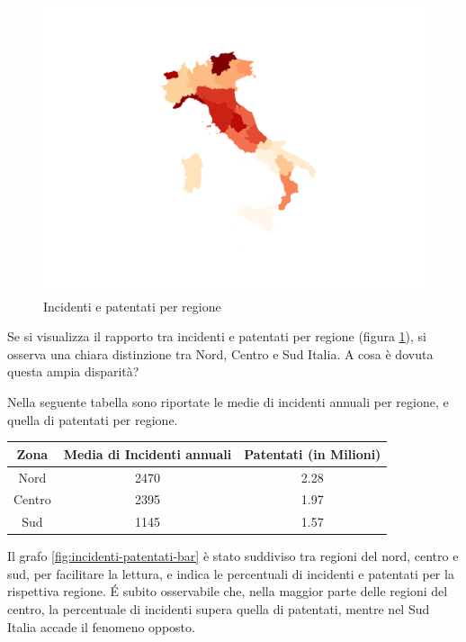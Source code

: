 \documentclass[a4paper,12pt]{report}
\begin{document}
\begin{figure}
    \includegraphics[width=\linewidth]{../src/incidenti/incidenti_aci/mappe_regioni/incidenti_patenti_italia.png}
    \caption{Incidenti e patentati per regione}
    \label{fig:incidenti-patentati}
\end{figure}

Se si visualizza il rapporto tra incidenti e patentati per regione 
(figura \ref{fig:incidenti-patentati}), si osserva una chiara distinzione 
tra Nord, Centro e Sud Italia. 
A cosa è dovuta questa ampia disparità?

Nella seguente tabella sono riportate le medie di incidenti annuali per regione, 
e quella di patentati per regione.

\begin{center}
    \def\arraystretch{1.5}%
    \begin{tabular}{ |c|c|c| } 
    \hline
    Zona & Media di Incidenti annuali & Patentati (in Milioni) \\ 
    \hline
    \rowcolor{TableGray}
    Nord    &   2470 &   2.28 \\ 
    Centro  &   2395 &   1.97 \\ 
    \rowcolor{TableGray}
    Sud     &   1145 &   1.57 \\ 
    \hline
    \end{tabular}
\end{center}

Il grafo \ref{fig:incidenti-patentati-bar} è stato suddiviso tra regioni del nord, 
centro e sud, per facilitare la lettura, e indica le percentuali di incidenti e 
patentati per la rispettiva regione. 
\'E subito osservabile che, nella maggior parte delle regioni del centro, 
la percentuale di incidenti supera quella di patentati, 
mentre nel Sud Italia accade il fenomeno opposto.
\end{document}
